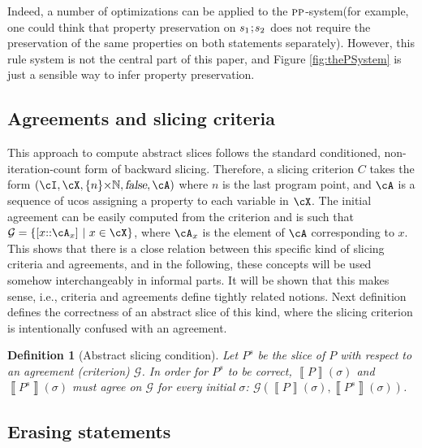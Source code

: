 \documentclass[prodmode,acmtocl]{acmsmall}
\def\prog{\ensuremath{P}\xspace}
\def\state{\ensuremath{\sigma}\xspace}
\def\crit{\ensuremath{C}\xspace}
\newcommand{\false}{\mbox{\sl false}}
\newcommand{\0}{\mbox{\bf 0}}
\newtheorem{mydefinition}[theorem]{Definition}
\newcommand{\CODE}[1]{\ensuremath{\mbox{\lstinline!#1!}\xspace}\xspace}
\newcommand{\SEMANTICS}[1]{\left\llbracket #1 \right\rrbracket}
\def\NATURALS{\mathbb{N}}
\def\AGREEM{\mathcal{G}}
\newcommand{\AGRS}[2]{[#2{::}#1]}
\newcommand{\RULENAME}[1]{\textsc{#1}}
\newcommand{\PSMTH}[1]{$\RULENAME{pp}$-#1}
\def\PSYSTEM{\PSMTH{system}\xspace}
\begin{document}
Indeed, a number of optimizations can be applied to the \PSYSTEM (for
example, one could think that property preservation on
$s_1\mbox{\CODE{;}}s_2$ does not require the preservation of the same
properties on both statements separately).  However, this rule system
is not the central part of this paper, and Figure \ref{fig:thePSystem}
is just a sensible way to infer property preservation.

\subsection{Agreements and slicing criteria}
\label{section:agreementsAndSlicingCriteria}

This approach to compute abstract slices follows the standard
conditioned, non-iteration-count form of backward slicing.  Therefore,
a slicing criterion $\crit$ takes the form
$(\cI,\cX,\{n\}{\times}\NATURALS,\false,\cA)$ where $n$ is the last
program point, and $\cA$ is a sequence of ucos assigning a property to
each variable in $\cX$.  The initial agreement can be easily computed
from the criterion and is such that $\AGREEM = \{
\AGRS{\cA_{x}}{x}~|~x\in \cX \}$, where $\cA_{x}$ is the element of
$\cA$ corresponding to $x$.  This shows that there is a close relation
between this specific kind of slicing criteria and agreements, and in
the following, these concepts will be used somehow interchangeably in
informal parts.  It will be shown that this makes sense, i.e.,
criteria and agreements define tightly related notions.  Next
definition defines the correctness of an abstract slice of this kind,
where the slicing criterion is intentionally confused with an
agreement.

\begin{mydefinition}[Abstract slicing condition]
  \label{def:abstractSlicingCondition}
  Let $\prog^s$ be the slice of $\prog$ with respect to an agreement
  (criterion) $\AGREEM$.  In order for $\prog^s$ to be correct,
  $\SEMANTICS{\prog}(\state)$ and $\SEMANTICS{\prog^s}(\state)$ must
  agree on $\AGREEM$ for every initial $\state$:
  $\AGREEM(\SEMANTICS{\prog}(\state), \SEMANTICS{\prog^s}(\state))$.
\end{mydefinition}

\subsection{Erasing statements}
\label{sec:erasingStatements}
\end{document}
